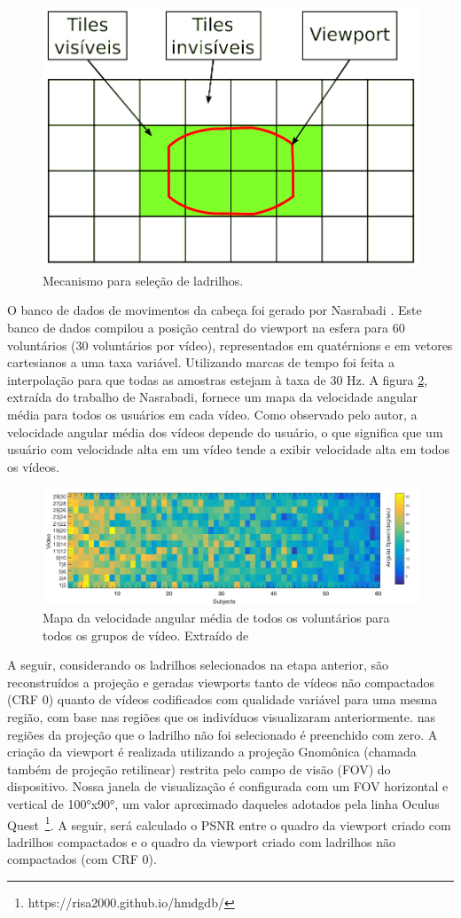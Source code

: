 \begin{figure}[htb]
    \centering
    \includegraphics[width=0.6\linewidth]{fig/tiles selection simples.png}
    \caption{Mecanismo para seleção de ladrilhos.}
    \label{fig:tilesSelection}
\end{figure}

O banco de dados de movimentos da cabeça foi gerado por Nasrabadi \cite{Nasrabadi2019}. Este banco de dados compilou a posição central do viewport na esfera para 60 voluntários (30 voluntários por vídeo), representados em quatérnions e em vetores cartesianos a uma taxa variável. Utilizando marcas de tempo foi feita a interpolação para que todas as amostras estejam à taxa de 30 Hz. A figura \ref{fig:datasetSpeedmap}, extraída do trabalho de Nasrabadi, fornece um mapa da velocidade angular média para todos os usuários em cada vídeo. Como observado pelo autor, a velocidade angular média dos vídeos depende do usuário, o que significa que um usuário com velocidade alta em um vídeo tende a exibir velocidade alta em todos os vídeos. 

\begin{figure}
    \centering
    \includegraphics[width=0.8\linewidth]{fig/datasetSpeedmap.png}
    \caption{Mapa da velocidade angular média de todos os voluntários para todos os grupos de vídeo. Extraído de  \cite{Nasrabadi2019}}
    \label{fig:datasetSpeedmap}
\end{figure}

A seguir, considerando os ladrilhos selecionados na etapa anterior, são reconstruídos a projeção e geradas viewports tanto de vídeos não compactados (CRF 0) quanto de vídeos codificados com qualidade variável para uma mesma região, com base nas regiões que os indivíduos visualizaram anteriormente. nas regiões da projeção que o ladrilho não foi selecionado é preenchido com zero. A criação da viewport é realizada utilizando a projeção Gnomônica (chamada também de projeção retilinear) restrita pelo campo de visão (FOV) do dispositivo. Nossa janela de visualização é configurada com um FOV horizontal e vertical de 100°x90°, um valor aproximado daqueles adotados pela linha Oculus Quest~\footnote{https://risa2000.github.io/hmdgdb/}. A seguir, será calculado o PSNR entre o quadro da viewport criado com ladrilhos compactados e o quadro da viewport criado com ladrilhos não compactados (com CRF 0).


